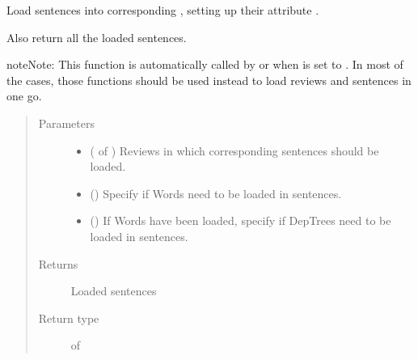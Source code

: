 \documentclass[letterpaper,10pt,english]{sphinxmanual}
\begin{document}

\begin{fulllineitems}
\label{\detokenize{load:loacore.load.sentence_load.load_sentences_in_reviews}}
Load sentences into corresponding , setting up their attribute .

Also return all the loaded sentences.

\begin{sphinxadmonition}{note}{Note:}
This function is automatically called by  or 
when  is set to .
In most of the cases, those functions should be used instead to load reviews and sentences in one go.
\end{sphinxadmonition}
\begin{quote}\begin{description}
\item[{Parameters}] \leavevmode\begin{itemize}
\item {} 
 ( of {\hyperref[\detokenize{classes:loacore.classes.classes.Review}]{}}) \textendash{} Reviews in which corresponding sentences should be loaded.

\item {} 
 () \textendash{} Specify if Words need to be loaded in sentences.

\item {} 
 () \textendash{} If Words have been loaded, specify if DepTrees need to be loaded in sentences.

\end{itemize}

\item[{Returns}] \leavevmode
Loaded sentences

\item[{Return type}] \leavevmode
{} of {\hyperref[\detokenize{classes:loacore.classes.classes.Sentence}]{}}

\end{description}\end{quote}

\end{fulllineitems}
\end{document}

